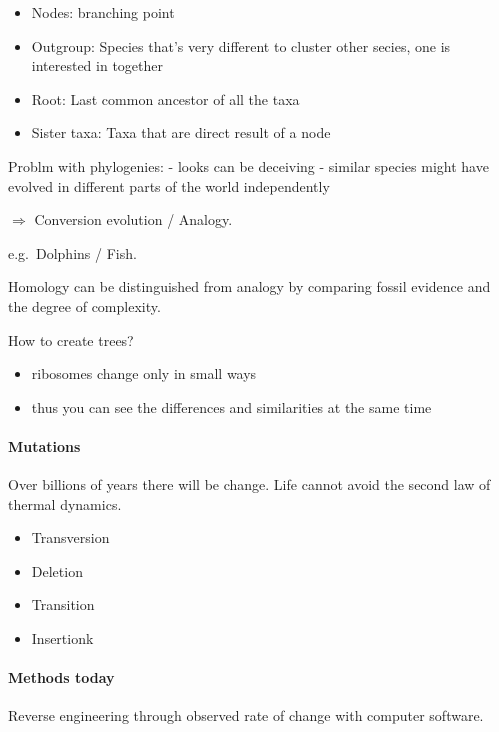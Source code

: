 \begin{itemize}
\tightlist
\item
  Nodes: branching point
\item
  Outgroup: Species that's very different to cluster other secies, one
  is interested in together
\item
  Root: Last common ancestor of all the taxa
\item
  Sister taxa: Taxa that are direct result of a node
\end{itemize}

Problm with phylogenies: - looks can be deceiving - similar species
might have evolved in different parts of the world independently

\(\Rightarrow\) Conversion evolution / Analogy.

e.g.~Dolphins / Fish.

Homology can be distinguished from analogy by comparing fossil evidence
and the degree of complexity.

How to create trees?

\begin{itemize}
\tightlist
\item
  ribosomes change only in small ways
\item
  thus you can see the differences and similarities at the same time
\end{itemize}

\hypertarget{mutations}{%
\paragraph{Mutations}\label{mutations}}

Over billions of years there will be change. Life cannot avoid the
second law of thermal dynamics.

\begin{itemize}
\tightlist
\item
  Transversion
\item
  Deletion
\item
  Transition
\item
  Insertionk
\end{itemize}

\hypertarget{methods-today}{%
\paragraph{Methods today}\label{methods-today}}

Reverse engineering through observed rate of change with computer
software.

